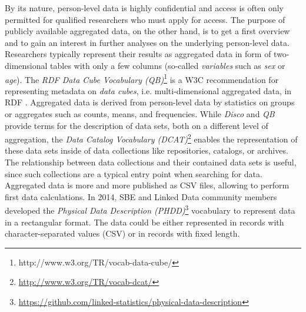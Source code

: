 \documentclass{llncs}
\begin{document}
By its nature, person-level data is highly confidential and access is often only permitted for qualified researchers who must apply for access. 
The purpose of publicly available aggregated data, on the other hand, is to get a first overview and to gain an interest in further analyses on the underlying person-level data.
Researchers typically represent their results as aggregated data in form of two-dimensional tables with only a few columns (so-called \emph{variables} such as \emph{sex} or \emph{age}).
The \emph{RDF Data Cube Vocabulary (QB)}\footnote{http://www.w3.org/TR/vocab-data-cube/} is a W3C recommendation for representing metadata on \emph{data cubes}, i.e. multi-dimensional aggregated data, in RDF \cite{Cyganiak2010}. 
Aggregated data is derived from person-level data by statistics on groups or aggregates such as counts, means, and frequencies.
While \emph{Disco} and \emph{QB} provide terms for the description of data sets, 
both on a different level of aggregation, 
the \emph{Data Catalog Vocabulary (DCAT)}\footnote{\url{http://www.w3.org/TR/vocab-dcat/}} enables the representation of these data sets inside of data collections like repositories, catalogs, or archives. 
The relationship between data collections and their contained data sets is useful, since such collections are a typical entry point when searching for data.
Aggregated data is more and more published as CSV files,
allowing to perform first data calculations.
In 2014, SBE and Linked Data community members developed the \emph{Physical Data Description (PHDD)}\footnote{\url{https://github.com/linked-statistics/physical-data-description}} vocabulary to represent data in a rectangular format. 
The data could be either represented in records with character-separated values (CSV) or in records with fixed length. 
\end{document}

